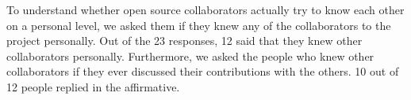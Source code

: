 To understand whether open source collaborators actually try to know each other on a personal level, we asked them if they knew any of the collaborators to the project personally. Out of the 23 responses, 12 said that they knew other collaborators personally. Furthermore, we asked the people who knew other collaborators if they ever discussed their contributions with the others. 10 out of 12 people replied in the affirmative. \\



